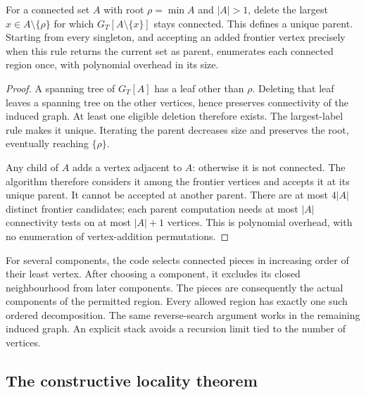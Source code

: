 \begin{lemma}\label{lem:reverse}
For a connected set $A$ with root $\rho=\min A$ and $|A|>1$, delete the
largest $x\in A\setminus\{\rho\}$ for which $G_T[A\setminus\{x\}]$ stays
connected. This defines a unique parent. Starting from every singleton,
and accepting an added frontier vertex precisely when this rule returns
the current set as parent, enumerates each connected region once, with
polynomial overhead in its size.
\end{lemma}
\begin{proof}
A spanning tree of $G_T[A]$ has a leaf other than $\rho$. Deleting that leaf
leaves a spanning tree on the other vertices, hence preserves connectivity
of the induced graph. At least one eligible deletion therefore exists.
The largest-label rule makes it unique. Iterating the parent decreases
size and preserves the root, eventually reaching $\{\rho\}$.

Any child of $A$ adds a vertex adjacent to $A$: otherwise it is not connected.
The algorithm therefore considers it among the frontier vertices and accepts
it at its unique parent. It cannot be accepted at another parent. There are
at most $4|A|$ distinct frontier candidates; each parent computation needs
at most $|A|$ connectivity tests on at most $|A|+1$ vertices. This is
polynomial overhead, with no enumeration of vertex-addition permutations.
\end{proof}

For several components, the code selects connected pieces in increasing
order of their least vertex. After choosing a component, it excludes its
closed neighbourhood from later components. The pieces are consequently
the actual components of the permitted region. Every allowed region has
exactly one such ordered decomposition. The same reverse-search argument
works in the remaining induced graph. An explicit stack avoids a recursion
limit tied to the number of vertices.

\subsection{The constructive locality theorem}

